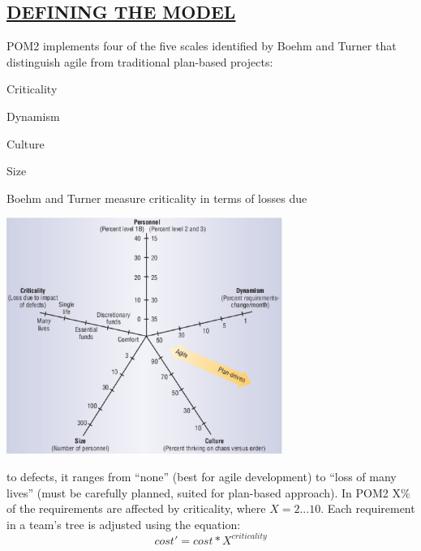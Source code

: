 \begin{kasten}
  \section*{ \hspace{0.1cm} {\color{red} \underline{DEFINING THE MODEL}}}
  \large{
    \begin{minipage}{4cm}
      POM2 implements four of the five scales identified by Boehm and Turner that distinguish agile from traditional
      plan-based projects: 
      \begin{smallitem}
      \item Criticality
      \item Dynamism
      \item Culture
      \item Size
      \end{smallitem}
      \vspace{3 mm}
      Boehm and Turner measure criticality in terms of losses due
    \end{minipage}
    \begin{minipage}{9cm}
      \includegraphics[width=9cm]{star.eps}
    \end{minipage}
 to defects, it ranges from ``none'' (best for agile development) 
      to     ``loss of many lives'' (must be carefully planned, suited for plan-based approach).  In POM2 X\% of the requirements
    are affected by criticality, where \begin{math} X = 2...10 \end{math}. Each requirement in a team's tree is adjusted 
    using the equation: \begin{equation} cost' = cost * X^{criticality} \end{equation}

}
\end{kasten}
